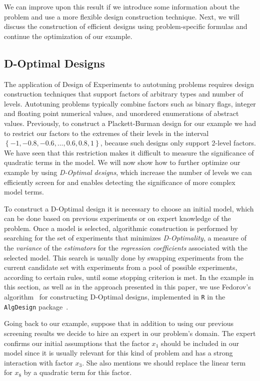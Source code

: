 \documentclass[conference]{IEEEtran}
\begin{document}
We can improve upon this result if we introduce some information about the
problem and use a more flexible design construction technique. Next, we will
discuss the construction of efficient designs using problem-specific formulas
and continue the optimization of our example.
\subsection{D-Optimal Designs}
\label{sec:org5fa0ca7}
The application of Design of Experiments to autotuning problems requires design
construction techniques that support factors of arbitrary types and number of
levels. Autotuning problems typically combine factors such as binary flags,
integer and floating point numerical values, and unordered enumerations of
abstract values. Previously, to construct a Plackett-Burman design for our
example we had to restrict our factors to the extremes of their levels in the
interval \(\left\{-1, -0.8, -0.6,\dots,0.6, 0.8, 1\right\}\), because such designs
only support 2-level factors. We have seen that this restriction makes it
difficult to measure the significance of quadratic terms in the model. We will
now show how to further optimize our example by using \emph{D-Optimal designs}, which
increase the number of levels we can efficiently screen for and enables
detecting the significance of more complex model terms.

To construct a D-Optimal design it is necessary to choose an initial model,
which can be done based on previous experiments or on expert knowledge of the
problem. Once a model is selected, algorithmic construction is performed by
searching for the set of experiments that minimizes \emph{D-Optimality}, a measure of
the \emph{variance} of the \emph{estimators} for the \emph{regression coefficients} associated
with the selected model. This search is usually done by swapping experiments
from the current candidate set with experiments from a pool of possible
experiments, according to certain rules, until some stopping criterion is met.
In the example in this section, as well as in the approach presented in this
paper, we use Fedorov's algorithm~\cite{fedorov1972theory} for
constructing D-Optimal designs, implemented in \texttt{R} in the \texttt{AlgDesign}
package~\cite{wheeler2014algdesign}.

Going back to our example, suppose that in addition to using our previous
screening results we decide to hire an expert in our problem's domain. The
expert confirms our initial assumptions that the factor \(x_1\) should be included
in our model since it is usually relevant for this kind of problem and has a
strong interaction with factor \(x_3\). She also mentions we should replace
the linear term for \(x_8\) by a quadratic term for this factor.
\end{document}

